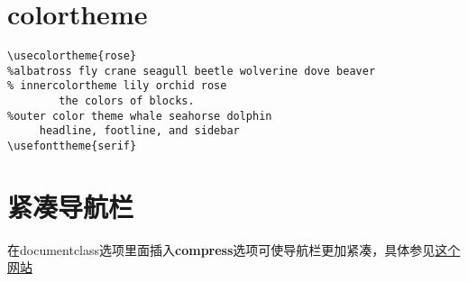 \documentclass[11pt,oneside]{book}
\begin{document}
\begin{common-format}
\section{colortheme}
\begin{Verbatim}
\usecolortheme{rose}
%albatross fly crane seagull beetle wolverine dove beaver
% innercolortheme lily orchid rose       
        the colors of blocks. 
%outer color theme whale seahorse dolphin     
     headline, footline, and sidebar
\usefonttheme{serif}
\end{Verbatim}


\section{紧凑导航栏}
在documentclass选项里面插入\textbf{compress}选项可使导航栏更加紧凑，具体参见\href{http://tex.stackexchange.com/questions/42917/how-to-hide-the-navigation-bar-in-latex-beamer}{这个网站}



\end{common-format}
\end{document}
